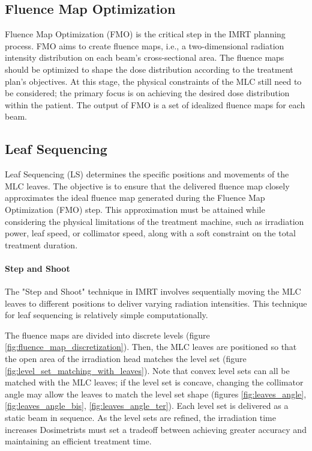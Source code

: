 \subsection[FMO]{Fluence Map Optimization}
Fluence Map Optimization (FMO) is the critical step in the IMRT planning process.
FMO aims to create fluence maps, i.e., a two-dimensional radiation intensity distribution on each beam's cross-sectional area.
The fluence maps should be optimized to shape the dose distribution according to the treatment plan's objectives.
At this stage, the physical constraints of the MLC still need to be considered; the primary focus is on achieving the desired dose distribution within the patient.
The output of FMO is a set of idealized fluence maps for each beam.

\subsection[LS]{Leaf Sequencing}
Leaf Sequencing (LS) determines the specific positions and movements of the MLC leaves.
The objective is to ensure that the delivered fluence map closely approximates the ideal fluence map generated during the Fluence Map Optimization (FMO) step.
This approximation must be attained while considering the physical limitations of the treatment machine, such as irradiation power, leaf speed, or collimator speed, along with a soft constraint on the total treatment duration.

\paragraph[S\&S]{Step and Shoot}
The "Step and Shoot" technique in IMRT involves sequentially moving the MLC leaves to different positions to deliver varying radiation intensities.
This technique for leaf sequencing is relatively simple computationally.

The fluence maps are divided into discrete levels (figure \ref{fig:fluence_map_discretization}).
Then, the MLC leaves are positioned so that the open area of the irradiation head matches the level set (figure \ref{fig:level_set_matching_with_leaves}).
Note that convex level sets can all be matched with the MLC leaves; if the level set is concave, changing the collimator angle may allow the leaves to match the level set shape (figures \ref{fig:leaves_angle}, \ref{fig:leaves_angle_bis}, \ref{fig:leaves_angle_ter}).
Each level set is delivered as a static beam in sequence.
As the level sets are refined, the irradiation time increases
Dosimetrists must set a tradeoff between achieving greater accuracy and maintaining an efficient treatment time.



